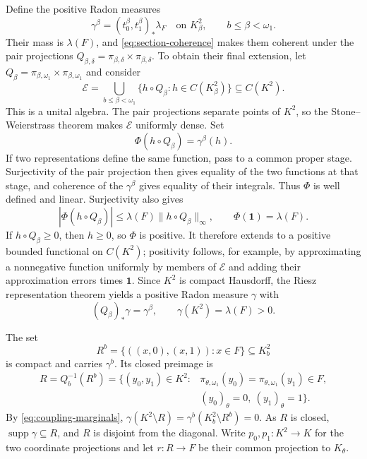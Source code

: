 \documentclass[a4paper,11pt]{amsart}
\theoremstyle{plain}
\theoremstyle{definition}
\theoremstyle{remark}
\newcommand{\supp}{\operatorname{supp}}
\newcommand{\one}{\mathbf 1}
\numberwithin{equation}{section}
\begin{document}
Define the positive Radon measures
\[
 \gamma^\beta=(t_0^\beta,t_1^\beta)_*\lambda_F
 \quad\text{on }K_\beta^2,
 \qquad b\leqslant\beta<\omega_1.
\]
Their mass is $\lambda(F)$, and \eqref{eq:section-coherence} makes them coherent under the pair projections
$Q_{\beta,\delta}=\pi_{\beta,\delta}\times\pi_{\beta,\delta}$.
To obtain their final extension, let $Q_\beta=\pi_{\beta,\omega_1}\times\pi_{\beta,\omega_1}$ and consider
\[
 \mathcal E=
 \bigcup_{b\leqslant\beta<\omega_1}
 \{h\circ Q_\beta:h\in C(K_\beta^2)\}
 \subseteq C(K^2).
\]
This is a unital algebra.  The pair projections separate points of $K^2$, so the Stone--Weierstrass theorem makes $\mathcal E$ uniformly dense.  Set
\[
 \Phi(h\circ Q_\beta)=\gamma^\beta(h).
\]
If two representations define the same function, pass to a common proper stage.  Surjectivity of the pair projection then gives equality of the two functions at that stage, and coherence of the $\gamma^\beta$ gives equality of their integrals.  Thus $\Phi$ is well defined and linear.  Surjectivity also gives
\[
 |\Phi(h\circ Q_\beta)|
 \leqslant\lambda(F)\|h\circ Q_\beta\|_\infty,
 \qquad \Phi(\one)=\lambda(F).
\]
If $h\circ Q_\beta\geqslant0$, then $h\geqslant0$, so $\Phi$ is positive.  It therefore extends to a positive bounded functional on $C(K^2)$; positivity follows, for example, by approximating a nonnegative function uniformly by members of $\mathcal E$ and adding their approximation errors times $\one$.  Since $K^2$ is compact Hausdorff, the Riesz representation theorem yields a positive Radon measure $\gamma$ with
\begin{equation}\label{eq:coupling-marginals}
 (Q_\beta)_*\gamma=\gamma^\beta,
 \qquad \gamma(K^2)=\lambda(F)>0.
\end{equation}

The set
\[
 R^b=\{((x,0),(x,1)):x\in F\}\subseteq K_b^2
\]
is compact and carries $\gamma^b$.  Its closed preimage is
\begin{equation}\label{eq:initial-relation}
 \begin{split}
 R=Q_b^{-1}(R^b)
 =\{(y_0,y_1)\in K^2:
 &\pi_{\theta,\omega_1}(y_0)=\pi_{\theta,\omega_1}(y_1)\in F,\\
 &(y_0)_\theta=0,\ (y_1)_\theta=1\}.
 \end{split}
\end{equation}
By \eqref{eq:coupling-marginals},
$\gamma(K^2\setminus R)=\gamma^b(K_b^2\setminus R^b)=0$.
As $R$ is closed, $\supp\gamma\subseteq R$, and $R$ is disjoint from the diagonal.  Write $p_0,p_1:K^2\to K$ for the two coordinate projections and let $r:R\to F$ be their common projection to $K_\theta$.
\end{document}
